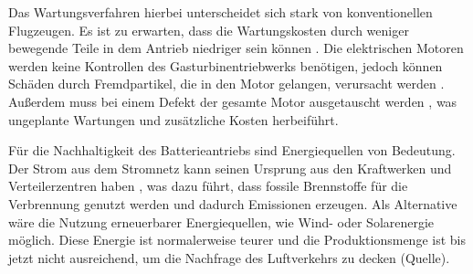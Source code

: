 



Das Wartungsverfahren hierbei unterscheidet sich stark von konventionellen Flugzeugen. 
Es ist zu erwarten, dass die Wartungskosten durch weniger bewegende Teile in dem Antrieb niedriger sein können \cite{dalmia2022powering}. 
%
Die elektrischen Motoren werden keine Kontrollen des Gasturbinentriebwerks benötigen, %
jedoch können Schäden durch Fremdpartikel, 
die in den Motor gelangen, verursacht werden \cite{reimers2018introduction}.
Außerdem muss bei einem Defekt der gesamte Motor ausgetauscht werden \cite{dalmia2022powering}, 
was ungeplante Wartungen und zusätzliche Kosten herbeiführt.

Für die Nachhaltigkeit des Batterieantriebs sind Energiequellen von Bedeutung. 
Der Strom aus dem Stromnetz kann seinen Ursprung aus 
den Kraftwerken und Verteilerzentren haben \cite{dalmia2022powering},
was dazu führt, dass fossile Brennstoffe für die Verbrennung genutzt 
werden und dadurch Emissionen erzeugen. 
Als Alternative wäre die Nutzung erneuerbarer Energiequellen, 
wie Wind- oder Solarenergie möglich. 
Diese Energie ist normalerweise teurer und die Produktionsmenge 
ist bis jetzt nicht ausreichend, um die Nachfrage des Luftverkehrs zu decken (Quelle).
